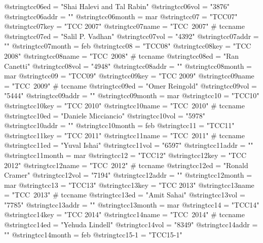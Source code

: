 @string{tcc06ed =               "Shai Halevi and Tal Rabin"}
@string{tcc06vol =              "3876"}
@string{tcc06addr =             ""}
@string{tcc06month =            mar}
@string{tcc07 =                 "TCC07"}
@string{tcc07key =              "TCC 2007"}
@string{tcc07name =             "TCC~2007" # tccname}
@string{tcc07ed =               "Salil P. Vadhan"}
@string{tcc07vol =              "4392"}
@string{tcc07addr =             ""}
@string{tcc07month =            feb}
@string{tcc08 =                 "TCC08"}
@string{tcc08key =              "TCC 2008"}
@string{tcc08name =             "TCC~2008" # tccname}
@string{tcc08ed =               "Ran Canetti"}
@string{tcc08vol =              "4948"}
@string{tcc08addr =             ""}
@string{tcc08month =            mar}
@string{tcc09 =                 "TCC09"}
@string{tcc09key =              "TCC 2009"}
@string{tcc09name =             "TCC~2009" # tccname}
@string{tcc09ed =               "Omer Reingold"}
@string{tcc09vol =              "5444"}
@string{tcc09addr =             ""}
@string{tcc09month =            mar}
@string{tcc10 =                 "TCC10"}
@string{tcc10key =              "TCC 2010"}
@string{tcc10name =             "TCC~2010" # tccname}
@string{tcc10ed =               "Daniele Micciancio"}
@string{tcc10vol =              "5978"}
@string{tcc10addr =             ""}
@string{tcc10month =            feb}
@string{tcc11 =                 "TCC11"}
@string{tcc11key =              "TCC 2011"}
@string{tcc11name =             "TCC~2011" # tccname}
@string{tcc11ed =               "Yuval Ishai"}
@string{tcc11vol =              "6597"}
@string{tcc11addr =             ""}
@string{tcc11month =            mar}
@string{tcc12 =                 "TCC12"}
@string{tcc12key =              "TCC 2012"}
@string{tcc12name =             "TCC~2012" # tccname}
@string{tcc12ed =               "Ronald Cramer"}
@string{tcc12vol =              "7194"}
@string{tcc12addr =             ""}
@string{tcc12month =            mar}
@string{tcc13 =                 "TCC13"}
@string{tcc13key =              "TCC 2013"}
@string{tcc13name =             "TCC~2013" # tccname}
@string{tcc13ed =               "Amit Sahai"}
@string{tcc13vol =              "7785"}
@string{tcc13addr =             ""}
@string{tcc13month =            mar}
@string{tcc14 =                 "TCC14"}
@string{tcc14key =              "TCC 2014"}
@string{tcc14name =             "TCC~2014" # tccname}
@string{tcc14ed =               "Yehuda Lindell"}
@string{tcc14vol =              "8349"}
@string{tcc14addr =             ""}
@string{tcc14month =            feb}
@string{tcc15-1 =               "TCC15-1"}

